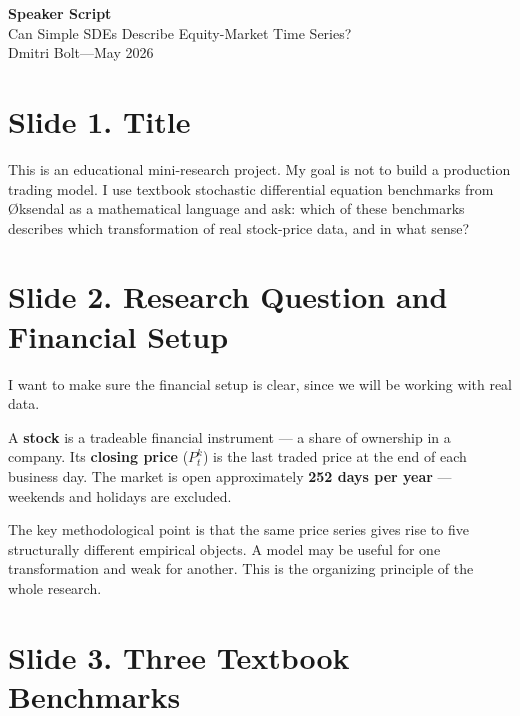 \documentclass[12pt,a4paper]{article}
\begin{document}
\begin{center}
  {\LARGE\bfseries Speaker Script}\\[6pt]
  {\large Can Simple SDEs Describe Equity-Market Time Series?}\\[4pt]
  {\color{slidegray} Dmitri Bolt\quad---\quad May 2026}
\end{center}

\bigskip

\section{Slide 1. Title}

This is an educational mini-research project.
My goal is not to build a production trading model.
I use textbook stochastic differential equation benchmarks from Øksendal
as a mathematical language and ask: which of these benchmarks describes
which transformation of real stock-price data, and in what sense?

\section{Slide 2. Research Question and Financial Setup}

I want to make sure the financial setup is clear, since we will be working
with real data.

A \textbf{stock} is a tradeable financial instrument --- a share of ownership
in a company.
Its \textbf{closing price} ($P_t^k$) is the last traded price at the end of each business day.
The market is open approximately \textbf{252 days per year} ---
weekends and holidays are excluded.

The key methodological point is that the same price series gives rise to five
structurally different empirical objects.
A model may be useful for one transformation and weak for another.
This is the organizing principle of the whole research.

\section{Slide 3. Three Textbook Benchmarks}
\end{document}
